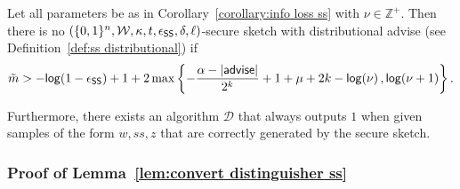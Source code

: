 \begin{lemma}
\label{lem:convert distinguisher ss}
Let all parameters be as in Corollary~\ref{corollary:info loss ss} with $\nu \in\mathbb{Z}^+$.  Then there is no $(\{0,1\}^n, \mathcal{W}, \kappa, t, \epsilon_{\mathsf{SS}}, \delta, \ell)$-secure sketch with distributional advise (see Definition~\ref{def:ss distributional}) if
\[
\tilde{m}> -\mathsf{log}\!\left(1-\epsilon_{\mathsf{SS}}\right) +1 + 2\max\left\{-\frac{\alpha-|{\mathsf{advise}}|}{2^k}+1+\mu+2k-\mathsf{log}\!\left(\nu\right), \mathsf{log}\!\left(\nu+1\right)\right\}.
\]

Furthermore, there exists an algorithm $\mathcal{D}$ that always outputs $1$ when given samples of the form $w, ss, z$ that are correctly generated by the secure sketch.
\end{lemma}
\subsubsection{Proof of Lemma~\ref{lem:convert distinguisher ss}}
